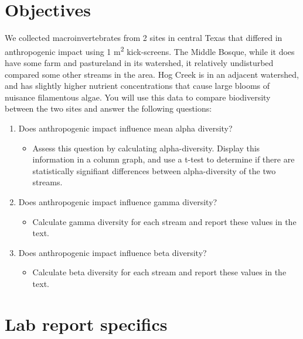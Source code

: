 \documentclass[11pt,]{article}
\providecommand{\tightlist}{%
\setlength{\itemsep}{0pt}\setlength{\parskip}{0pt}}
\begin{document}
\section{Objectives}\label{objectives}

We collected macroinvertebrates from 2 sites in central Texas that
differed in anthropogenic impact using 1 m\textsuperscript{2}
kick-screens. The Middle Bosque, while it does have some farm and
pastureland in its watershed, it relatively undisturbed compared some
other streams in the area. Hog Creek is in an adjacent watershed, and
has slightly higher nutrient concentrations that cause large blooms of
nuisance filamentous algae. You will use this data to compare
biodiversity between the two sites and answer the following questions:

\begin{enumerate}
\def\labelenumi{\arabic{enumi}.}
\tightlist
\item
  Does anthropogenic impact influence mean alpha diversity?

  \begin{itemize}
  \tightlist
  \item
    Assess this question by calculating alpha-diversity. Display this
    information in a column graph, and use a t-test to determine if
    there are statistically signifiant differences between
    alpha-diversity of the two streams.
  \end{itemize}
\item
  Does anthropogenic impact influence gamma diversity?

  \begin{itemize}
  \tightlist
  \item
    Calculate gamma diversity for each stream and report these values in
    the text.
  \end{itemize}
\item
  Does anthropogenic impact influence beta diversity?

  \begin{itemize}
  \tightlist
  \item
    Calculate beta diversity for each stream and report these values in
    the text.
  \end{itemize}
\end{enumerate}

\section{Lab report specifics}\label{lab-report-specifics}
\end{document}
